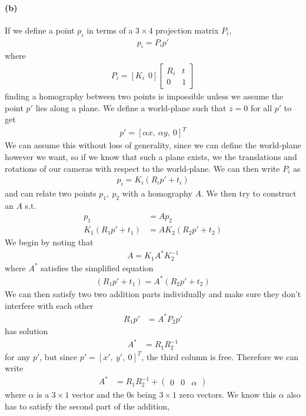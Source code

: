 \documentclass{article}
\newcommand{\spart}[1]{\paragraph{(#1)}}
\begin{document}
\spart{b} If we define a point $p_i$ in terms of a $3\times4$ projection matrix $P_i$,
\begin{align}
	p_i = P_i p'
\end{align}
where 
\begin{align}
	P_i = [K_i \ \ 0] \begin{bmatrix}
		R_i & t \\ 0 & 1
	\end{bmatrix}
\end{align}
finding a homography between two points is impossible unless we assume the point $p'$ lies along a plane. We define a world-plane such that $z=0$ for all $p'$ to get 
\begin{align}
	p'= [\alpha x,\  \alpha y,\  0]^T 
\end{align}
We can assume this without loss of generality, since we can define the world-plane however we want, so if we know that such a plane exists, we the translations and rotations of our cameras with respect to the world-plane. We can then write $P_i$ as 
\begin{align}
	p_i = K_i(R_ip' + t_i)
\end{align} 
and can relate two points $p_1,\ p_2$ with a homography $A$. We then try to construct an $A$ s.t. 
\begin{align}
	p_1  &= Ap_2 \\
	K_1(R_1p'+t_1) &= AK_2(R_2p'+t_2)
\end{align}
We begin by noting that
\begin{align}
	A = K_1 A^* K_2^{-1}
\end{align}
where $A^*$ satisfies the simplified equation
\begin{align}
(R_1p'+t_1)= A^*(R_2p'+t_2)
\end{align}
We can then satisfy two two addition parts individually and make sure they don't interfere with each other
\begin{align}
	R_1p' &= A^*P_2p' 
\end{align}
has solution 
\begin{align}
	A^* &= R_1R_2^{-1}
\end{align}
for any $p'$, but since $p' = [x',\ y',\ 0]^T$, the third column is free. Therefore we can write
\begin{align}
	A^* &= R_1R_2^{-1} + \begin{pmatrix}
		0 & 0 & \alpha
	\end{pmatrix}
\end{align}
where $\alpha$ is a $3\times 1$ vector and the $0$s being $3\times 1$ zero vectors. We know this $\alpha$ also has to satisfy the second part of the addition, 
\end{document}
